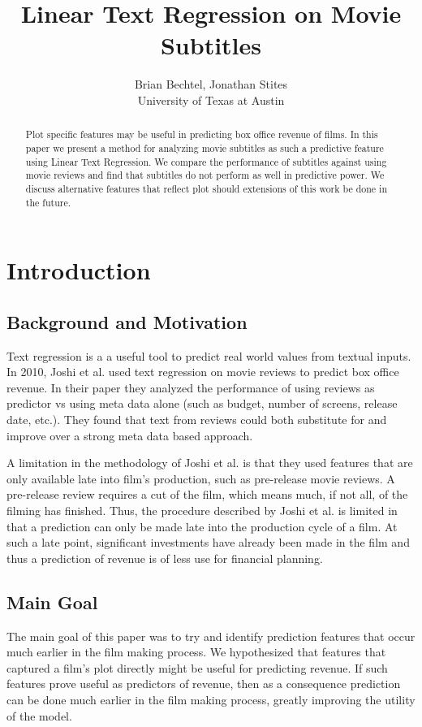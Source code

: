 \documentclass[11pt]{article}
\begin{document}
\title{Linear Text Regression on Movie Subtitles}
\author{Brian Bechtel, Jonathan Stites\\
       University of Texas at Austin}
\date{}

\maketitle

\begin{abstract}
\noindent
Plot specific features may be useful in predicting box office revenue of films.
In this paper we present a method for analyzing movie subtitles as such a predictive
feature using Linear Text Regression. We compare the performance of subtitles against
using movie reviews and find that subtitles do not perform as well in predictive power.
We discuss alternative features that reflect plot should extensions of this work be
done in the future.
\end{abstract}

\section{Introduction}
\subsection{Background and Motivation}
Text regression is a a useful tool to predict real world values from textual inputs.
In 2010, Joshi et al. used text regression on movie reviews to predict box office revenue.
In their paper they analyzed the performance of using reviews as predictor vs using meta
data alone (such as budget, number of screens, release date, etc.). They found that text
from reviews could both substitute for and improve over a strong meta data based approach.

A limitation in the methodology of Joshi et al. is that they used features that are only
available late into film's production, such as pre-release movie reviews. A pre-release
review requires a cut of the film, which means much, if not all, of the filming has
finished. Thus, the procedure described by Joshi et al. is limited in that a prediction
can only be made late into the production cycle of a film. At such a late point,
significant investments have already been made in the film and thus a prediction of
revenue is of less use for financial planning.

\subsection{Main Goal}
The main goal of this paper was to try and identify prediction features that occur much
earlier in the film making process. We hypothesized that features that captured a film's
plot directly might be useful for predicting revenue. If such features prove useful as
predictors of revenue, then as a consequence prediction can be done much earlier in the
film making process, greatly improving the utility of the model.
\end{document}
